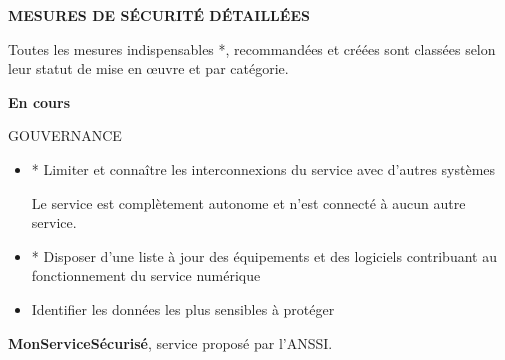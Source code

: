 \documentclass[9pt, a4paper]{article}
\begin{document}
  \textbf{MESURES DE SÉCURITÉ DÉTAILLÉES}

  \textcolor{gris}{Toutes les mesures indispensables *, recommandées et créées sont classées selon
  leur statut de mise en œuvre et par catégorie.}

  \vskip 0.5cm

  \textbf{En cours}

  \begin{tcolorbox}[colback=white, colframe=lisere, boxrule=1px]
    \textcolor{bleu}{GOUVERNANCE}
    \begin{itemize}
      \item * Limiter et connaître les interconnexions du service avec d'autres systèmes

        \textcolor{gris}{Le service est complètement autonome et n'est connecté à aucun autre
        service.}
      \item * Disposer d'une liste à jour des équipements et des logiciels contribuant au
        fonctionnement du service numérique
      \item Identifier les données les plus sensibles à protéger
    \end{itemize}
  \end{tcolorbox}

  \vskip 1cm

  \textcolor{bleu}{\textbf{MonServiceSécurisé}}, service proposé par l'ANSSI.
\end{document}
